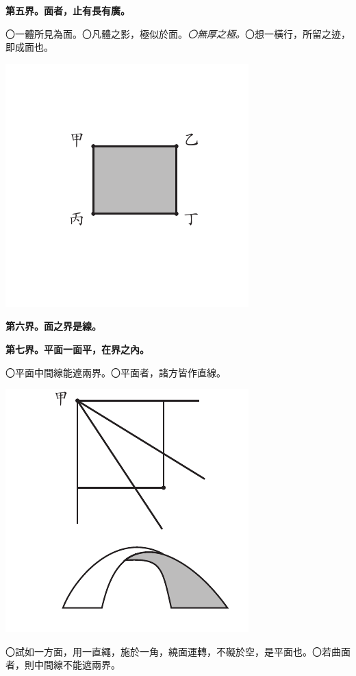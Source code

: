 \documentclass[12pt,b5paper,landscape]{article}
\newcommand{\ccom}[1]{{\footnotesize \emph{〇#1}}}
\newcommand{\bcom}[1]{〇#1}
\newcommand{\cthm}[1]{{
\vspace{8pt}

\bfseries #1}}
\begin{document}
\begin{multicols}{2}
\cthm{第五界。面者，止有長有廣。}\bcom{一體所見為面。}\bcom{凡體之影，極似於面。}\ccom{無厚之極。}\bcom{想一橫行，所留之迹，即成面也。}
\begin{center}
\includegraphics[angle=90]{eu4}
\end{center}

\cthm{第六界。面之界是線。}

\cthm{第七界。平面一面平，在界之內。}\bcom{平面中間線能遮兩界。}\bcom{平面者，諸方皆作直線。}
\begin{center}
\includegraphics[angle=90]{eu5}
\end{center}
\bcom{試如一方面，用一直繩，施於一角，繞面運轉，不礙於空，是平面也。}\bcom{若曲面者，則中間線不能遮兩界。}


\end{multicols}
\end{document}
